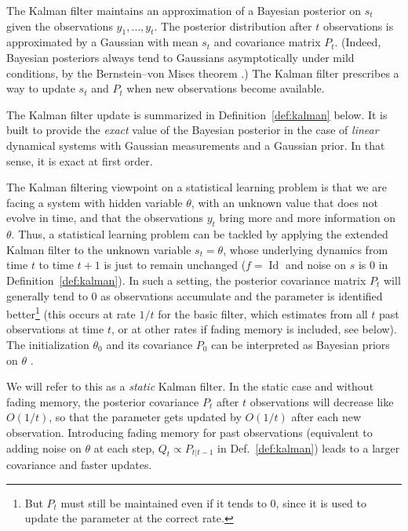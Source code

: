\documentclass[11pt,a4paper]{article}
\DeclareMathOperator{\Id}{Id}
\newcommand{\1}{\mathbbm{1}}
\theoremstyle{yannthm}
\theoremstyle{yannthm2}
\numberwithin{equation}{section}
\begin{document}
The Kalman filter
maintains an approximation of a Bayesian posterior on $s_t$ given the
observations $y_1,\ldots,y_t$. The posterior distribution after
$t$ observations is approximated by a Gaussian with mean $s_t$ and
covariance matrix $P_t$. (Indeed, Bayesian posteriors always tend to
Gaussians asymptotically under mild conditions, by the Bernstein--von
Mises theorem \cite{van2000asymptotic}.) The Kalman filter
prescribes a way to update $s_t$ and $P_t$ when new observations become
available.

The Kalman filter update is summarized in Definition~\ref{def:kalman}
below.  It is built to provide the \emph{exact} value of the Bayesian
posterior in the case of \emph{linear} dynamical systems with Gaussian
measurements and a Gaussian prior. In that sense, it is exact at first
order.

The Kalman filtering viewpoint on a statistical learning problem is that
we are facing a system with hidden variable $\theta$, with an unknown
value that does not evolve in time, and that the observations $y_t$ bring
more and more information on $\theta$.  Thus, a statistical learning
problem can be tackled by applying the extended Kalman filter to the
unknown variable $s_t=\theta$, whose underlying dynamics from time $t$ to
time $t+1$ is just to remain unchanged ($f=\Id$ and noise on $s$ is $0$
in Definition~\ref{def:kalman}). In such a setting, the posterior
covariance matrix $P_t$ will generally tend to $0$ as observations
accumulate and the parameter is identified better\footnote{But $P_t$ must
still be maintained even if it tends to $0$, since it is used to update
the parameter at the correct rate.} (this occurs at rate $1/t$ for the
basic filter, which estimates from all $t$ past observations at time $t$,
or at other rates if fading memory is included, see below). The
initialization $\theta_0$ and its covariance $P_0$ can be interpreted as
Bayesian priors on $\theta$ \cite{singhalwu1988,ljung83}.

We will refer to this as a \emph{static} Kalman filter.  In the static
case and without fading memory, the posterior covariance $P_t$ after $t$
observations will decrease like $O(1/t)$, so that the parameter gets
updated by $O(1/t)$ after each new observation. Introducing fading memory
for past observations (equivalent to adding noise on $\theta$ at each
step, $Q_t\propto P_{t|t-1}$ in Def.~\ref{def:kalman}) leads to a larger
covariance and faster updates.
\end{document}
